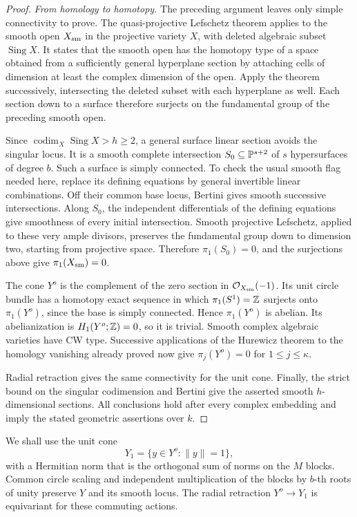\begin{proof}
\emph{From homology to homotopy.}
The preceding argument leaves only simple connectivity to prove.
The quasi-projective Lefschetz theorem
\cite[Theorem~1.1.3(ii)]{HammLe85} applies to the smooth open
\(X_{\mathrm{sm}}\) in the projective variety \(X\), with deleted algebraic
subset \(\operatorname{Sing}X\).
It states that the smooth open has the homotopy type of a space
obtained from a sufficiently general hyperplane section by
attaching cells of dimension at least the complex dimension
of the open.  Apply the theorem successively, intersecting the deleted
subset with each hyperplane as well.  Each section down to a surface
therefore surjects on the fundamental group of the preceding smooth
open.

Since \(\operatorname{codim}_X\operatorname{Sing}X>h\ge2\),
a general surface linear section avoids the singular locus.
It is a smooth complete intersection \(S_0\subseteq\mathbb P^{s+2}\)
of \(s\) hypersurfaces of degree \(b\).  Such a surface is simply
connected.  To check the usual smooth flag needed here, replace
its defining equations by general invertible linear combinations.
Off their common base locus, Bertini gives smooth successive
intersections.  Along \(S_0\), the independent differentials of
the defining equations give smoothness of every initial
intersection.  Smooth projective Lefschetz, applied to these
very ample divisors, preserves the fundamental group down to
dimension two, starting from projective space.  Therefore
\(\pi_1(S_0)=0\), and the surjections above give
\(\pi_1(X_{\mathrm{sm}})=0\).

The cone \(Y^o\) is the complement of the zero section in
\(\mathcal O_{X_{\mathrm{sm}}}(-1)\).  Its unit circle bundle has a homotopy
exact sequence in which
\(\pi_1(S^1)=\mathbb Z\) surjects onto \(\pi_1(Y^o)\), since the base
is simply connected.  Hence \(\pi_1(Y^o)\) is abelian.
Its abelianization is \(H_1(Y^o;\mathbb Z)=0\), so it is trivial.
Smooth complex algebraic varieties have CW type.  Successive
applications of the Hurewicz theorem \cite[Theorem~4.32]{HatcherAT}
to the homology vanishing
already proved now give \(\pi_j(Y^o)=0\) for \(1\le j\le\kappa\).

Radial retraction gives the same connectivity for the unit cone.
Finally, the strict bound on the singular codimension and Bertini
give the asserted smooth \(h\)-dimensional sections.
All conclusions hold after every complex embedding and imply the
stated geometric assertions over \(k\).
\end{proof}

We shall use the unit cone
\[
 Y_1=\{y\in Y^o:\|y\|=1\},
\]
with a Hermitian norm that is the orthogonal sum of norms on the
\(M\) blocks.  Common circle scaling and independent multiplication
of the blocks by \(b\)-th roots of unity preserve \(Y\) and its
smooth locus.  The radial retraction \(Y^o\to Y_1\) is equivariant
for these commuting actions.
